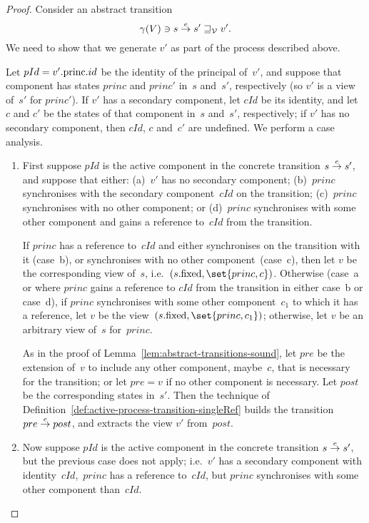 \begin{proof}
Consider an abstract transition
\[
\gamma(V) \ni s \stackrel{e}\rightarrow s' \sqsupseteq_{\mathcal{V}} v'.
\]
We need to show that we generate $v'$ as part of the process described above.

Let $pId = v'.\mathrm{princ}.id$ be the identity of the principal of~$v'$, and suppose
that component has states $princ$ and $princ'$ in~$s$ and~$s'$, respectively
(so $v'$ is a view of~$s'$ for $princ'$).  If $v'$ has a secondary component,
let $cId$ be its identity, and let $c$ and $c'$ be the states of that
component in~$s$ and~$s'$, respectively; if $v'$ has no secondary component,
then $cId$, $c$ and~$c'$ are undefined.  We perform a case analysis.

\begin{enumerate}
\item
First suppose $pId$ is the active component in the concrete transition \( {s
  \stackrel{e}\rightarrow s'} \), and suppose that either: (a)~$v'$ has no secondary
component; (b)~$princ$ synchronises with the secondary component~$cId$ on the
transition; (c)~$princ$ synchronises with no other component; or (d)~$princ$
synchronises with some other component and gains a reference to~$cId$ from the
transition.

If $princ$ has a reference to~$cId$ and either synchronises on the transition
with it (case~b), or synchronises with no other component~(case~c), then let
$v$ be the corresponding view of~$s$, i.e.~$(s.\fixed, \set{princ, c})$.
Otherwise (case~a or where $princ$ gains a reference to $cId$ from the
transition in either case~b or case~d), if $princ$ synchronises with some
other component~$c_1$ to which it has a reference, let $v$ be the
view~$(s.\fixed, \set{princ, c_1})$; otherwise, let $v$ be an arbitrary view
of~$s$ for~$princ$.

As in the proof of Lemma~\ref{lem:abstract-transitions-sound}, let $pre$ be
the extension of~$v$ to include any other component, maybe~$c$, that is
necessary for the transition; or let $pre = v$ if no other component is
necessary.  Let $post$ be the corresponding states in~$s'$.  Then the
technique of Definition~\ref{def:active-process-transition-singleRef} builds
the transition \( pre \stackrel{e}\rightarrow post \), and extracts the view $v'$
from~$post$.


\item 
Now suppose $pId$ is the active component in the concrete transition \( {s
  \stackrel{e}\rightarrow s'} \), but the previous case does not apply; i.e.~$v'$ has a
secondary component with identity~$cId$,\, $princ$ has a reference to~$cId$,
but $princ$ synchronises with some other component than~$cId$.  


\end{enumerate}
\end{proof}
